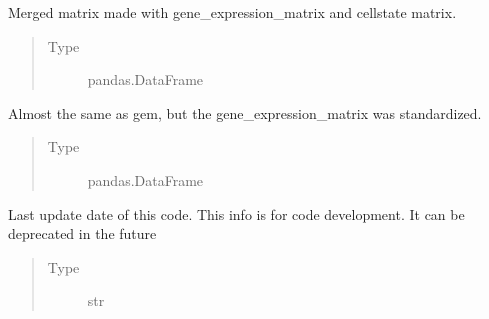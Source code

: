 \documentclass[letterpaper,10pt,english]{sphinxmanual}
\begin{document}
\begin{fulllineitems}
\begin{fulllineitems}
\end{fulllineitems}


\begin{fulllineitems}
\label{\detokenize{modules/celloracle:celloracle.Net.gem}}
Merged matrix made with gene\_expression\_matrix and cellstate matrix.
\begin{quote}\begin{description}
\item[{Type}] \leavevmode
pandas.DataFrame

\end{description}\end{quote}

\end{fulllineitems}


\begin{fulllineitems}
\label{\detokenize{modules/celloracle:celloracle.Net.gem_standerdized}}
Almost the same as gem, but the gene\_expression\_matrix was standardized.
\begin{quote}\begin{description}
\item[{Type}] \leavevmode
pandas.DataFrame

\end{description}\end{quote}

\end{fulllineitems}


\begin{fulllineitems}
\label{\detokenize{modules/celloracle:celloracle.Net.library_last_update_date}}
Last update date of this code. This info is for code development. It can be deprecated in the future
\begin{quote}\begin{description}
\item[{Type}] \leavevmode
str


\end{description}
\end{quote}
\end{fulllineitems}
\end{fulllineitems}
\end{document}
